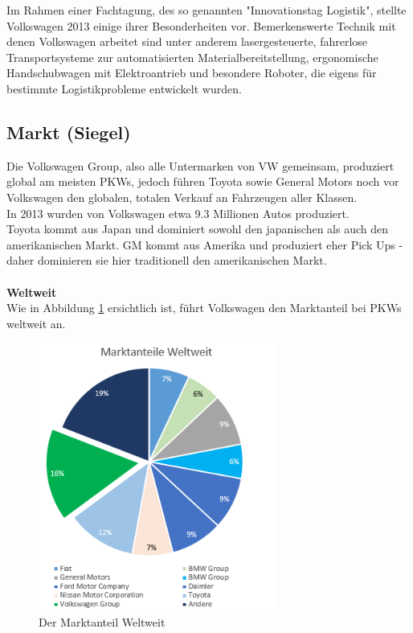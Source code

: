 \documentclass[12pt]{article}
\begin{document}
Im Rahmen einer Fachtagung, des so genannten "Innovationstag Logistik", stellte Volkswagen 2013 einige ihrer Besonderheiten vor. Bemerkenswerte Technik mit denen Volkswagen arbeitet sind unter anderem lasergesteuerte, fahrerlose Transportsysteme zur automatisierten Materialbereitstellung, ergonomische Handschubwagen mit Elektroantrieb und besondere Roboter, die eigens für bestimmte Logistikprobleme entwickelt wurden.\cite{wolfsburg}

\subsection{Markt (Siegel)}
Die Volkswagen Group, also alle Untermarken von VW gemeinsam, produziert global am meisten PKWs, jedoch führen Toyota sowie General Motors noch vor Volkswagen den globalen, totalen Verkauf an Fahrzeugen aller Klassen. \\
In 2013 wurden von Volkswagen etwa 9.3 Millionen Autos produziert. \\
Toyota kommt aus Japan und dominiert sowohl den japanischen als auch den amerikanischen Markt. GM kommt aus Amerika und produziert eher Pick Ups - daher dominieren sie hier traditionell den amerikanischen Markt.
\\\\
\textbf{Weltweit}\\
Wie in Abbildung \ref{fig:marktwelt} ersichtlich ist, führt Volkswagen den Marktanteil bei PKWs weltweit an. 
\begin{figure}[here!]
\centering
\includegraphics[width=0.7\textwidth]{images/maww}
\caption{Der Marktanteil Weltweit}
\label{fig:marktwelt}
\end{figure}\FloatBarrier
\end{document}
